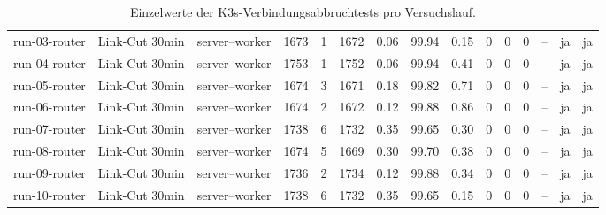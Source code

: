 \begin{table}
\begin{tabular}{l l p{3.2cm} r r r r r r r r r r r r}
run-03-router & Link-Cut 30min & server--worker & 1673 & 1 & 1672 & 0.06 & 99.94 & 0.15 & 0 & 0 & 0 & -- & ja & ja \\
run-04-router & Link-Cut 30min & server--worker & 1753 & 1 & 1752 & 0.06 & 99.94 & 0.41 & 0 & 0 & 0 & -- & ja & ja \\
run-05-router & Link-Cut 30min & server--worker & 1674 & 3 & 1671 & 0.18 & 99.82 & 0.71 & 0 & 0 & 0 & -- & ja & ja \\
run-06-router & Link-Cut 30min & server--worker & 1674 & 2 & 1672 & 0.12 & 99.88 & 0.86 & 0 & 0 & 0 & -- & ja & ja \\
run-07-router & Link-Cut 30min & server--worker & 1738 & 6 & 1732 & 0.35 & 99.65 & 0.30 & 0 & 0 & 0 & -- & ja & ja \\
run-08-router & Link-Cut 30min & server--worker & 1674 & 5 & 1669 & 0.30 & 99.70 & 0.38 & 0 & 0 & 0 & -- & ja & ja \\
run-09-router & Link-Cut 30min & server--worker & 1736 & 2 & 1734 & 0.12 & 99.88 & 0.34 & 0 & 0 & 0 & -- & ja & ja \\
run-10-router & Link-Cut 30min & server--worker & 1738 & 6 & 1732 & 0.35 & 99.65 & 0.15 & 0 & 0 & 0 & -- & ja & ja \\
\bottomrule
\end{tabular}
\caption{Einzelwerte der K3s-Verbindungsabbruchtests pro Versuchslauf.}
\label{tab:appendix-k3s-link-cut-runs}
\end{table}

